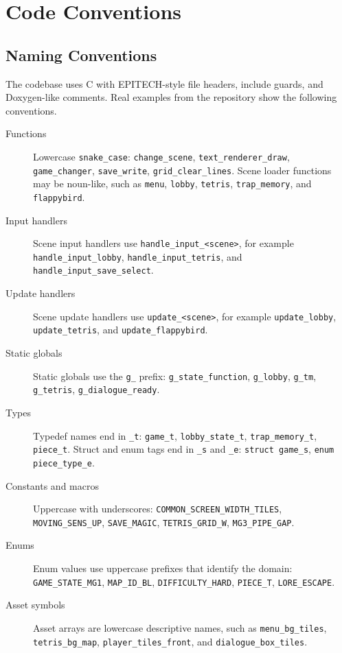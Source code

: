 \chapter{Code Conventions}

\section{Naming Conventions}

The codebase uses C with EPITECH-style file headers, include guards, and Doxygen-like comments. Real examples from the repository show the following conventions.

\begin{description}
  \item[Functions] Lowercase \texttt{snake\_case}: \texttt{change\_scene}, \texttt{text\_renderer\_draw}, \texttt{game\_changer}, \texttt{save\_write}, \texttt{grid\_clear\_lines}. Scene loader functions may be noun-like, such as \texttt{menu}, \texttt{lobby}, \texttt{tetris}, \texttt{trap\_memory}, and \texttt{flappybird}.
  \item[Input handlers] Scene input handlers use \texttt{handle\_input\_<scene>}, for example \texttt{handle\_input\_lobby}, \texttt{handle\_input\_tetris}, and \texttt{handle\_input\_save\_select}.
  \item[Update handlers] Scene update handlers use \texttt{update\_<scene>}, for example \texttt{update\_lobby}, \texttt{update\_tetris}, and \texttt{update\_flappybird}.
  \item[Static globals] Static globals use the \texttt{g\_} prefix: \texttt{g\_state\_function}, \texttt{g\_lobby}, \texttt{g\_tm}, \texttt{g\_tetris}, \texttt{g\_dialogue\_ready}.
  \item[Types] Typedef names end in \texttt{\_t}: \texttt{game\_t}, \texttt{lobby\_state\_t}, \texttt{trap\_memory\_t}, \texttt{piece\_t}. Struct and enum tags end in \texttt{\_s} and \texttt{\_e}: \texttt{struct game\_s}, \texttt{enum piece\_type\_e}.
  \item[Constants and macros] Uppercase with underscores: \texttt{COMMON\_SCREEN\_WIDTH\_TILES}, \texttt{MOVING\_SENS\_UP}, \texttt{SAVE\_MAGIC}, \texttt{TETRIS\_GRID\_W}, \texttt{MG3\_PIPE\_GAP}.
  \item[Enums] Enum values use uppercase prefixes that identify the domain: \texttt{GAME\_STATE\_MG1}, \texttt{MAP\_ID\_BL}, \texttt{DIFFICULTY\_HARD}, \texttt{PIECE\_T}, \texttt{LORE\_ESCAPE}.
  \item[Asset symbols] Asset arrays are lowercase descriptive names, such as \texttt{menu\_bg\_tiles}, \texttt{tetris\_bg\_map}, \texttt{player\_tiles\_front}, and \texttt{dialogue\_box\_tiles}.
\end{description}

